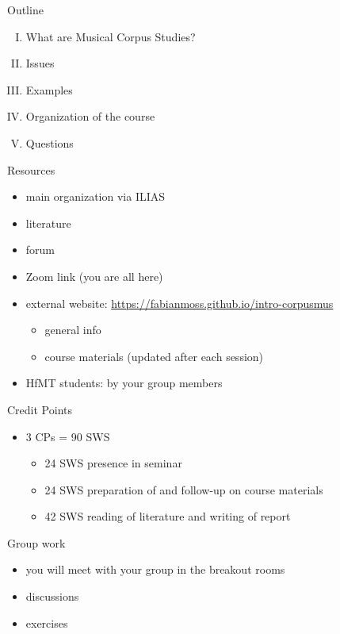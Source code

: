 
\begin{frame}{Outline}
  \begin{enumerate}[I.]
    \item What are Musical Corpus Studies?
    \item Issues
    \item Examples
    \item Organization of the course
    \item Questions
  \end{enumerate}
\end{frame}

\begin{frame}{Resources}
  \begin{itemize}
    \item main organization via ILIAS
    \item literature
    \item forum
    \item Zoom link (you are all here)
    \item external website: \url{https://fabianmoss.github.io/intro-corpusmus}
    \begin{itemize}
      \item general info
      \item course materials (updated after each session)
    \end{itemize}
    \item HfMT students: by your group members
  \end{itemize}
\end{frame}

\begin{frame}{Credit Points}
  \begin{itemize}
    \item 3 CPs = 90 SWS
    \begin{itemize}
      \item 24 SWS presence in seminar
      \item 24 SWS preparation of and follow-up on course materials
      \item 42 SWS reading of literature and writing of report
    \end{itemize}
  \end{itemize}
\end{frame}

\begin{frame}{Group work}
  \begin{itemize}
    \item you will meet with your group in the breakout rooms
    \item discussions
    \item exercises
  \end{itemize}
\end{frame}

